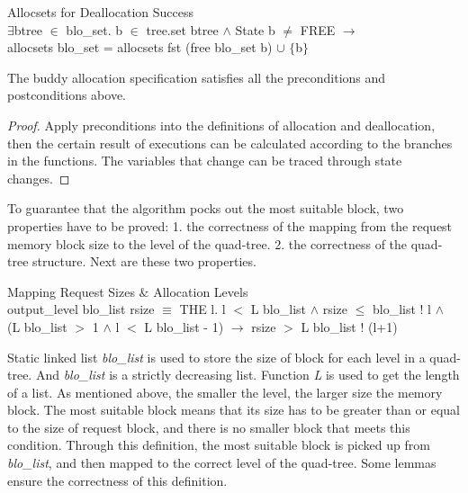 \documentclass[runningheads]{llncs}
\begin{document}
\begin{definition} {Allocsets for Deallocation Success} \\
$\exists$btree $\in$ blo\_set. b $\in$ tree.set btree $\wedge$ State b $\neq$ FREE $\longrightarrow$ \\
\phantom{x} \hspace{10pt} allocsets blo\_set = allocsets fst (free blo\_set b) $\cup$ $\lbrace$b$\rbrace$
\end{definition}

\begin{theorem}
The buddy allocation specification satisfies all the preconditions and postconditions above.
\end{theorem}

\begin{proof}
Apply preconditions into the definitions of allocation and deallocation, then the certain result of executions can be calculated according to the branches in the functions. The variables that change can be traced through state changes.
\end{proof}

To guarantee that the algorithm pocks out the most suitable block, two properties have to be proved: 1. the correctness of the mapping from the request memory block size to the level of the quad-tree. 2. the correctness of the quad-tree structure. Next are these two properties.

\begin{definition} {Mapping Request Sizes $\&$ Allocation Levels} \\
output\_level blo\_list rsize $\equiv$ THE l. l $<$ L blo\_list $\wedge$ rsize $\le$ blo\_list ! l $\wedge$ \\
\phantom{x} \hspace{10pt} (L blo\_list $>$ 1 $\wedge$ l $<$ L blo\_list - 1) $\longrightarrow$ rsize $>$ L blo\_list ! (l+1)
\end{definition}

Static linked list \textsl{blo\_list} is used to store the size of block for each level in a quad-tree. And \textsl{blo\_list} is a strictly decreasing list. Function \textsl{L} is used to get the length of a list. As mentioned above, the smaller the level, the larger size the memory block. The most suitable block means that its size has to be greater than or equal to the size of request block, and there is no smaller block that meets this condition. Through this definition, the most suitable block is picked up from \textsl{blo\_list}, and then mapped to the correct level of the quad-tree. Some lemmas ensure the correctness of this definition.
\end{document}
